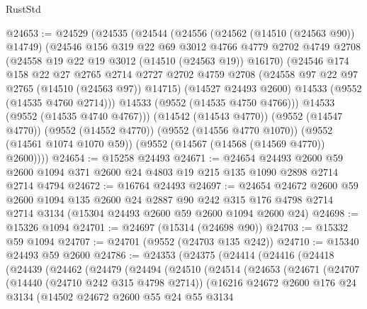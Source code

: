 \begin{lexlean}{RustStd}
\begin{coremodule}
@24653 := @24529
    (@24535
      (@24544
        (@24556
          (@24562 (@14510 (@24563 @90)) @14749)
          (@24546
            @156
            @319
            @22
            @69
            @3012
            @4766
            @4779
            @2702
            @4749
            @2708
            (@24558 @19 @22 @19 @3012 (@14510 (@24563 @19)) @16170)
            (@24546
              @174
              @158
              @22
              @27
              @2765
              @2714
              @2727
              @2702
              @4759
              @2708
              (@24558 @97 @22 @97 @2765 (@14510 (@24563 @97)) @14715)
              (@14527 @24493 @2600)
              @14533
              (@9552 (@14535 @4760 @2714)))
            @14533
            (@9552 (@14535 @4750 @4766)))
          @14533
          (@9552 (@14535 @4740 @4767)))
        (@14542 (@14543 @4770))
        (@9552 (@14547 @4770))
        (@9552 (@14552 @4770))
        (@9552 (@14556 @4770 @1070))
        (@9552 (@14561 @1074 @1070 @59))
        (@9552 (@14567 (@14568 (@14569 @4770)) @2600))))
@24654 := @15258 @24493
@24671 := @24654
    @24493
    @2600
    @59
    @2600
    @1094
    @371
    @2600
    @24
    @4803
    @19
    @215
    @135
    @1090
    @2898
    @2714
    @2714
    @4794
@24672 := @16764 @24493
@24697 := @24654
    @24672
    @2600
    @59
    @2600
    @1094
    @135
    @2600
    @24
    @2887
    @90
    @242
    @315
    @176
    @4798
    @2714
    @2714
    @3134
    (@15304 @24493 @2600 @59 @2600 @1094 @2600 @24)
@24698 := @15326 @1094
@24701 := @24697 (@15314 (@24698 @90))
@24703 := @15332 @59 @1094
@24707 := @24701 (@9552 (@24703 @135 @242))
@24710 := @15340 @24493 @59 @2600
@24786 := @24353
    (@24375
      (@24414
        (@24416
          (@24418
            (@24439
              (@24462
                (@24479
                  (@24494
                    (@24510
                      (@24514
                        (@24653
                          (@24671
                            (@24707
                              (@14440 (@24710 @242 @315 @4798 @2714))
                              (@16216
                                @24672
                                @2600
                                @176
                                @24
                                @3134
                                (@14502
                                  @24672
                                  @2600
                                  @55
                                  @24
                                  @55
                                  @3134

\end{coremodule}
\end{lexlean}

